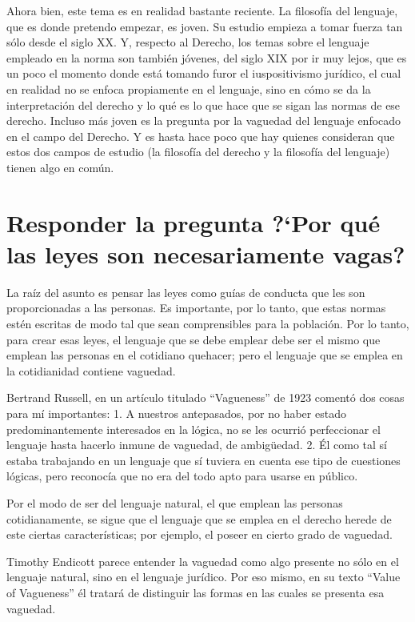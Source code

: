\documentclass[]{book}
\begin{document}
Ahora bien, este tema es en realidad bastante reciente. La filosofía del
lenguaje, que es donde pretendo empezar, es joven. Su estudio empieza a
tomar fuerza tan sólo desde el siglo XX. Y, respecto al Derecho, los
temas sobre el lenguaje empleado en la norma son también jóvenes, del
siglo XIX por ir muy lejos, que es un poco el momento donde está tomando
furor el iuspositivismo jurídico, el cual en realidad no se enfoca
propiamente en el lenguaje, sino en cómo se da la interpretación del
derecho y lo qué es lo que hace que se sigan las normas de ese derecho.
Incluso más joven es la pregunta por la vaguedad del lenguaje enfocado
en el campo del Derecho. Y es hasta hace poco que hay quienes consideran
que estos dos campos de estudio (la filosofía del derecho y la filosofía
del lenguaje) tienen algo en común.

\section*{Responder la pregunta ?`Por qué las leyes son necesariamente vagas?}

La raíz del asunto es pensar las leyes como guías de conducta que les
son proporcionadas a las personas. Es importante, por lo tanto, que
estas normas estén escritas de modo tal que sean comprensibles para la
población. Por lo tanto, para crear esas leyes, el lenguaje que se debe
emplear debe ser el mismo que emplean las personas en el cotidiano
quehacer; pero el lenguaje que se emplea en la cotidianidad contiene
vaguedad.

Bertrand Russell, en un artículo titulado ``Vagueness'' de 1923 comentó
dos cosas para mí importantes: 1. A nuestros antepasados, por no haber
estado predominantemente interesados en la lógica, no se les ocurrió
perfeccionar el lenguaje hasta hacerlo inmune de vaguedad, de
ambigüedad. 2. Él como tal sí estaba trabajando en un lenguaje que sí
tuviera en cuenta ese tipo de cuestiones lógicas, pero reconocía que no
era del todo apto para usarse en público.

Por el modo de ser del lenguaje natural, el que emplean las personas
cotidianamente, se sigue que el lenguaje que se emplea en el derecho
herede de este ciertas características; por ejemplo, el poseer en cierto
grado de vaguedad.

Timothy Endicott parece entender la vaguedad como algo presente no sólo
en el lenguaje natural, sino en el lenguaje jurídico. Por eso mismo, en
su texto ``Value of Vagueness'' él tratará de distinguir las formas en
las cuales se presenta esa vaguedad.
\end{document}
